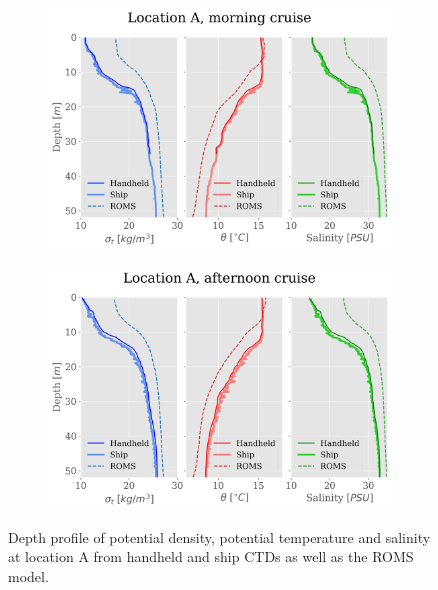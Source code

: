 \documentclass[a4paper,10pt,english]{article}
\begin{document}
\begin{figure}[H]
    \begin{adjustwidth}{-2.5cm}{-2.5cm}  %
    \begin{subfigure}{0.65\textwidth}
            \centering
            \includegraphics[width=1.\linewidth]{../figures/combined_profiles/Location_A_morning_cruise.png}
            \caption{}
            \label{fig:morning_A}
    \end{subfigure}%
    \begin{subfigure}{0.65\textwidth}
            \centering
            \includegraphics[width=1.\linewidth]{../figures/combined_profiles/Location_A_afternoon_cruise.png}
            \caption{}
            \label{fig:afternoon_A}
    \end{subfigure}
    \end{adjustwidth}
    
    \caption{Depth profile of potential density, potential temperature and salinity at location A from handheld and ship CTDs as well as the ROMS model.}
    \label{fig:location_A}
\end{figure}
\end{document}
